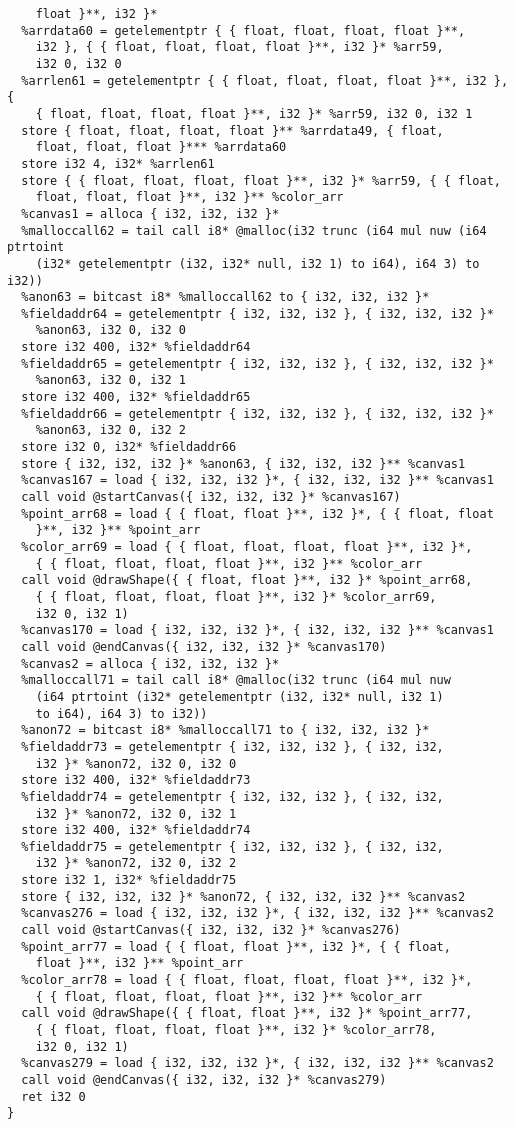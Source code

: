 \documentclass[main.tex]{subfiles}
\begin{document}
{\begin{lstlisting}
    float }**, i32 }*
  %arrdata60 = getelementptr { { float, float, float, float }**,
    i32 }, { { float, float, float, float }**, i32 }* %arr59,
    i32 0, i32 0
  %arrlen61 = getelementptr { { float, float, float, float }**, i32 }, { 
    { float, float, float, float }**, i32 }* %arr59, i32 0, i32 1
  store { float, float, float, float }** %arrdata49, { float, 
    float, float, float }*** %arrdata60
  store i32 4, i32* %arrlen61
  store { { float, float, float, float }**, i32 }* %arr59, { { float,
    float, float, float }**, i32 }** %color_arr
  %canvas1 = alloca { i32, i32, i32 }*
  %malloccall62 = tail call i8* @malloc(i32 trunc (i64 mul nuw (i64 ptrtoint
    (i32* getelementptr (i32, i32* null, i32 1) to i64), i64 3) to i32))
  %anon63 = bitcast i8* %malloccall62 to { i32, i32, i32 }*
  %fieldaddr64 = getelementptr { i32, i32, i32 }, { i32, i32, i32 }*
    %anon63, i32 0, i32 0
  store i32 400, i32* %fieldaddr64
  %fieldaddr65 = getelementptr { i32, i32, i32 }, { i32, i32, i32 }*
    %anon63, i32 0, i32 1
  store i32 400, i32* %fieldaddr65
  %fieldaddr66 = getelementptr { i32, i32, i32 }, { i32, i32, i32 }*
    %anon63, i32 0, i32 2
  store i32 0, i32* %fieldaddr66
  store { i32, i32, i32 }* %anon63, { i32, i32, i32 }** %canvas1
  %canvas167 = load { i32, i32, i32 }*, { i32, i32, i32 }** %canvas1
  call void @startCanvas({ i32, i32, i32 }* %canvas167)
  %point_arr68 = load { { float, float }**, i32 }*, { { float, float
    }**, i32 }** %point_arr
  %color_arr69 = load { { float, float, float, float }**, i32 }*,
    { { float, float, float, float }**, i32 }** %color_arr
  call void @drawShape({ { float, float }**, i32 }* %point_arr68,
    { { float, float, float, float }**, i32 }* %color_arr69,
    i32 0, i32 1)
  %canvas170 = load { i32, i32, i32 }*, { i32, i32, i32 }** %canvas1
  call void @endCanvas({ i32, i32, i32 }* %canvas170)
  %canvas2 = alloca { i32, i32, i32 }*
  %malloccall71 = tail call i8* @malloc(i32 trunc (i64 mul nuw
    (i64 ptrtoint (i32* getelementptr (i32, i32* null, i32 1)
    to i64), i64 3) to i32))
  %anon72 = bitcast i8* %malloccall71 to { i32, i32, i32 }*
  %fieldaddr73 = getelementptr { i32, i32, i32 }, { i32, i32,
    i32 }* %anon72, i32 0, i32 0
  store i32 400, i32* %fieldaddr73
  %fieldaddr74 = getelementptr { i32, i32, i32 }, { i32, i32,
    i32 }* %anon72, i32 0, i32 1
  store i32 400, i32* %fieldaddr74
  %fieldaddr75 = getelementptr { i32, i32, i32 }, { i32, i32,
    i32 }* %anon72, i32 0, i32 2
  store i32 1, i32* %fieldaddr75
  store { i32, i32, i32 }* %anon72, { i32, i32, i32 }** %canvas2
  %canvas276 = load { i32, i32, i32 }*, { i32, i32, i32 }** %canvas2
  call void @startCanvas({ i32, i32, i32 }* %canvas276)
  %point_arr77 = load { { float, float }**, i32 }*, { { float,
    float }**, i32 }** %point_arr
  %color_arr78 = load { { float, float, float, float }**, i32 }*,
    { { float, float, float, float }**, i32 }** %color_arr
  call void @drawShape({ { float, float }**, i32 }* %point_arr77,
    { { float, float, float, float }**, i32 }* %color_arr78,
    i32 0, i32 1)
  %canvas279 = load { i32, i32, i32 }*, { i32, i32, i32 }** %canvas2
  call void @endCanvas({ i32, i32, i32 }* %canvas279)
  ret i32 0
}


\end{lstlisting}}
\end{document}
